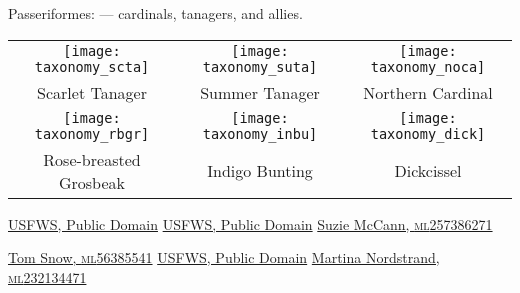 \documentclass[t]{beamer}
\begin{document}
%

\begin{frame}{Passeriformes:  — cardinals, tanagers, and allies.}
	
	\begin{tabular}{ccc}
		\texttt{[image: taxonomy\_scta]} &
		\texttt{[image: taxonomy\_suta]} &
		\texttt{[image: taxonomy\_noca]} \tabularnewline
		Scarlet Tanager & Summer Tanager & Northern Cardinal \tabularnewline[1em]
		\texttt{[image: taxonomy\_rbgr]} &
		\texttt{[image: taxonomy\_inbu]} &
		\texttt{[image: taxonomy\_dick]} \tabularnewline
		Rose-breasted Grosbeak &
		Indigo Bunting &
		Dickcissel \tabularnewline
	\end{tabular}
		
		\vfilll
		
		\tiny
		
		\href{https://flickr.com/photos/usfwsnortheast/50109221467}{USFWS, Public Domain} \hfill 
		\href{https://flickr.com/photos/usfwsnortheast/51177620670}{USFWS, Public Domain} \hfill
		\href{https://macaulaylibrary.org/asset/257386271}{Suzie McCann, \textsc{ml}257386271}
		
		\href{https://macaulaylibrary.org/asset/56385541}{Tom Snow, \textsc{ml}56385541}
		\hfill
		\href{https://www.flickr.com/photos/43322816@N08/51385513517}{USFWS, Public Domain} 
		\hfill
		\href{https://macaulaylibrary.org/asset/232134471}{Martina Nordstrand, \textsc{ml}232134471} 
		
	

	
\end{frame}

%
\end{document}
